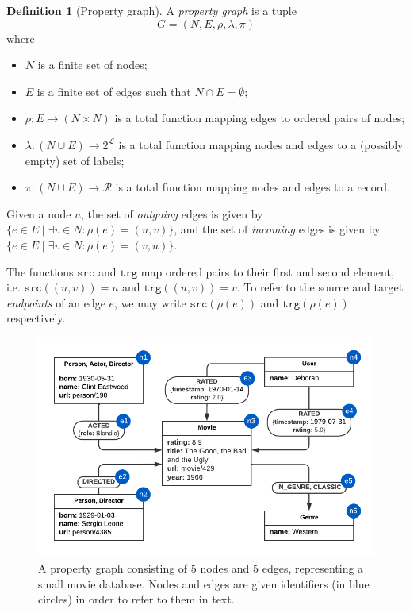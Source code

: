 \documentclass{report}
\theoremstyle{definition}
\newtheorem{definition}{Definition}
\newcommand{\src}{\mathtt{src}}
\newcommand{\trg}{\mathtt{trg}}
\begin{document}
\begin{definition}[Property graph]
  \label{def:pg}
  A \emph{property graph} is a tuple $$G = (N, E, \rho, \lambda, \pi)$$ where
  \begin{itemize}
    \item $N$ is a finite set of nodes;
    \item $E$ is a finite set of edges such that $N \cap E = \emptyset$;
    \item $\rho : E \to (N \times N)$ is a total function mapping edges to ordered pairs of nodes;
    \item $\lambda : (N \cup E) \to 2^{\mathcal{L}}$ is a total function mapping nodes and edges to a (possibly empty) set of labels;
    \item $\pi : (N \cup E) \to \mathcal{R}$ is a total function mapping nodes and edges to a record.
  \end{itemize}
\end{definition}

Given a node $u$, the set of \emph{outgoing} edges is given by $\{e \in E \mid \exists v \in N : \rho(e) = (u, v)\}$, and the set of \emph{incoming} edges is given by $\{e \in E \mid \exists v \in N : \rho(e) = (v, u)\}$.

The functions $\src$ and $\trg$ map ordered pairs to their first and second element, i.e. $\src((u, v)) = u$ and $\trg((u, v)) = v$. To refer to the source and target \emph{endpoints} of an edge $e$, we may write $\src(\rho(e))$ and $\trg(\rho(e))$ respectively.

\begin{figure}[t]
  \centering
  \includegraphics{figures/pg.pdf}
  \caption[A property graph representing a small movie database]{A property graph consisting of 5 nodes and 5 edges, representing a small movie database. Nodes and edges are given identifiers (in blue circles) in order to refer to them in text.}
  \label{fig:pg}
\end{figure}
\end{document}
